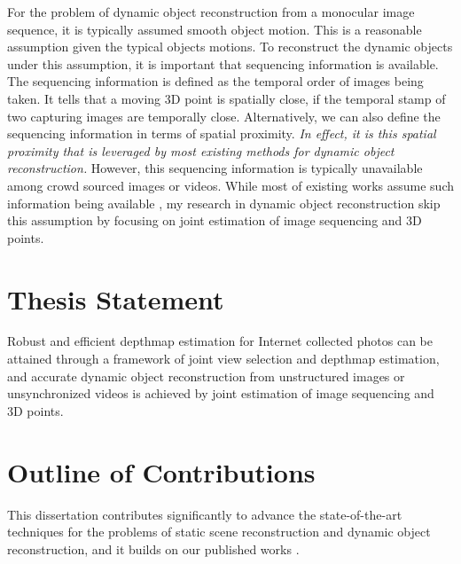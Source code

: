 For the problem of dynamic object reconstruction from a monocular image sequence, it is typically assumed smooth object motion. This is a reasonable assumption given the typical objects motions. To reconstruct the dynamic objects under this assumption, it is important that sequencing information is available. The sequencing information is defined as the temporal order of images being taken. It tells that a moving 3D point is spatially close, if the temporal stamp of two capturing images are temporally close. 
Alternatively, we can also define the sequencing information in terms of spatial proximity.
\emph{In effect, it is this spatial proximity that is leveraged by most existing methods for dynamic object reconstruction.} However, this sequencing information is typically unavailable among crowd sourced images or videos. While most of existing works assume such information being available \cite{Park_ECCV2010,Park_ICCV2011,Valmadre_ECCV2012,Valmadre_CVPR2012}, my research in dynamic object reconstruction skip this assumption by focusing on joint estimation of image sequencing and 3D points.

\section{Thesis Statement}
Robust and efficient depthmap estimation for Internet collected photos can be attained through a framework of joint view selection and depthmap estimation, and accurate dynamic object reconstruction from unstructured images or unsynchronized videos is achieved by joint estimation of image sequencing and 3D points.

\section{Outline of Contributions}
This dissertation contributes significantly to advance the state-of-the-art techniques for the problems of static scene reconstruction and dynamic object reconstruction, and it builds on our published works \cite{zheng2014patchmatch,zheng2014joint,zhengiccv_2015}.

